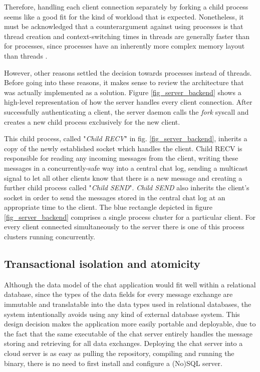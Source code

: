 Therefore, handling each client connection separately by forking a child process seems like a good fit for the kind of workload that is expected. Nonetheless, it must be acknowledged that a counterargument against using processes is that thread creation and context-switching times in threads are generally faster than for processes, since processes have an inherently more complex memory layout than threads \cite{Kerrisk2010}.

However, other reasons settled the decision towards processes instead of threads. Before going into these reasons, it makes sense to review the architecture that was actually implemented as a solution. Figure \ref{fig_server_backend} shows a high-level representation of how the server handles every client connection. After successfully authenticating a client, the server daemon calls the \textit{fork} syscall and creates a new child process exclusively for the new client.
 
This child process, called "\textit{Child RECV}" in fig. \ref{fig_server_backend}, inherits a copy of the newly established socket which handles the client. Child RECV is responsible for reading any incoming messages from the client, writing these messages in a concurrently-safe way into a central chat log, sending a multicast signal to let all other clients know that there is a new message and creating a further child process called "\textit{Child SEND}". \textit{Child SEND} also inherits the client's socket in order to send the messages stored in the central chat log at an appropriate time to the client. The blue rectangle depicted in figure \ref{fig_server_backend} comprises a single process cluster for a particular client. For every client connected simultaneously to the server there is one of this process clusters running concurrently.

\subsection{Transactional isolation and atomicity}
Although the data model of the chat application would fit well within a relational database, since the types of the data fields for every message exchange are immutable and translatable into the data types used in relational databases, the system intentionally avoids using any kind of external database system. This design decision makes the application more easily portable and deployable, due to the fact that the same executable of the chat server entirely handles the message storing and retrieving for all data exchanges. Deploying the chat server into a cloud server is as easy as pulling the repository, compiling and running the binary, there is no need to first install and configure a (No)SQL server.

